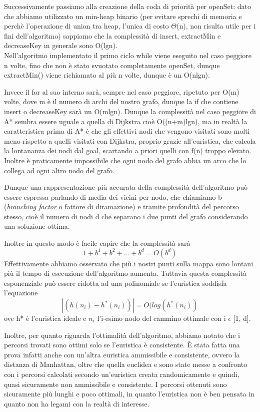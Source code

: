 \documentclass[12pt,a4paper]{report}
\begin{document}
Successivamente passiamo alla creazione della coda di priorità per openSet: dato che abbiamo utilizzato un min-heap binario (per evitare sprechi di memoria e perchè l'operazione di union tra heap, l'unica di costo \(\Theta\)(n), non risulta utile per i fini dell'algoritmo) sappiamo che la complessità di insert, extractMin e decreaseKey in generale sono O(lgn).
\\

Nell'algoritmo implementato il primo ciclo while viene eseguito nel caso peggiore n volte, fino che non è stato svuotato completamente openSet, dunque extractMin() viene richiamato al più n volte, dunque è un O(nlgn).


Invece il for al suo interno sarà, sempre nel caso peggiore, ripetuto per O(m) volte, dove m è il numero di archi del nostro grafo, dunque la if che contiene insert o decreaseKey sarà un O(mlgn). Dunque la complessità nel caso peggiore di A* sembra essere uguale a quella di Dijkstra cioè O((n+m)lgn), ma in realtà la caratteristica prima di A* è che gli effettivi nodi che vengono visitati sono molti meno rispetto a quelli visitati con Dijkstra, proprio grazie all'euristica, che calcola la lontananza dei nodi dal goal, scartando a priori quelli con f(n) troppo elevato.
Inoltre è praticamente impossibile che ogni nodo del grafo abbia un arco che lo collega ad ogni altro nodo del grafo.

Dunque una rappresentazione più accurata della complessità dell'algoritmo può essere espressa parlando di media dei vicini per nodo, che chiamiamo b (\emph{branching factor} o fattore di diramazione) e tramite profondità del percorso stesso, cioè il numero di nodi d che separano i due punti del grafo considerando una soluzione ottima.

Inoltre in questo modo è facile capire che la complessità sarà \[1+b^1+b^2+...+b^d = O(b^{d})\]\newpage
Effettivamente abbiamo osservato che più i nostri punti sulla mappa sono lontani più il tempo di esecuzione dell'algoritmo aumenta.
Tuttavia questa complessità esponenziale può essere ridotta ad una polinomiale se l'euristica soddisfa l'equazione \[|(h(n_i)-h^*(n_i))| = O(log(h^*(n_i))\]
ove h* è l'euristica ideale e \(n_i\) l'i-esimo nodo del cammino ottimale con i \(\epsilon\) [1, d].


Inoltre, per quanto riguarda l'ottimalità dell'algoritmo, abbiamo notato che i percorsi trovati sono ottimi solo se l'euristica è consistente. È stata fatta una prova infatti anche con un'altra euristica ammissibile e consistente, ovvero la distanza di Manhattan, oltre che quella euclidea e sono state messe a confronto con i percorsi calcolati secondo un'euristica creata randomicamente e quindi, quasi sicuramente non ammissibile e consistente.
I percorsi ottenuti sono sicuramente più lunghi e poco ottimali, in quanto l'euristica non è ben pensata in quanto non ha legami con la realtà di interesse. 
\end{document}
